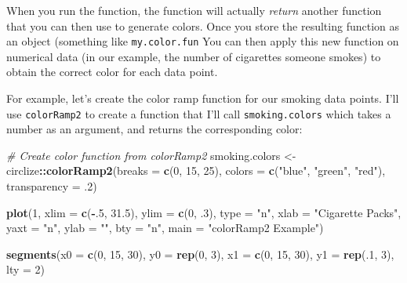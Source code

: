 \documentclass[]{book}
\newenvironment{Shaded}{\begin{snugshade}}{\end{snugshade}}
\newcommand{\KeywordTok}[1]{\textcolor[rgb]{0.13,0.29,0.53}{\textbf{#1}}}
\newcommand{\DataTypeTok}[1]{\textcolor[rgb]{0.13,0.29,0.53}{#1}}
\newcommand{\DecValTok}[1]{\textcolor[rgb]{0.00,0.00,0.81}{#1}}
\newcommand{\FloatTok}[1]{\textcolor[rgb]{0.00,0.00,0.81}{#1}}
\newcommand{\StringTok}[1]{\textcolor[rgb]{0.31,0.60,0.02}{#1}}
\newcommand{\CommentTok}[1]{\textcolor[rgb]{0.56,0.35,0.01}{\textit{#1}}}
\newcommand{\OperatorTok}[1]{\textcolor[rgb]{0.81,0.36,0.00}{\textbf{#1}}}
\newcommand{\NormalTok}[1]{#1}
\theoremstyle{definition}
\theoremstyle{definition}
\theoremstyle{remark}
\begin{document}
When you run the function, the function will actually \emph{return}
another function that you can then use to generate colors. Once you
store the resulting function as an object (something like
\texttt{my.color.fun} You can then apply this new function on numerical
data (in our example, the number of cigarettes someone smokes) to obtain
the correct color for each data point.

For example, let's create the color ramp function for our smoking data
points. I'll use \texttt{colorRamp2} to create a function that I'll call
\texttt{smoking.colors} which takes a number as an argument, and returns
the corresponding color:

\begin{Shaded}
\begin{Highlighting}[]
\CommentTok{# Create color function from colorRamp2}
\NormalTok{smoking.colors <-}\StringTok{ }\NormalTok{circlize}\OperatorTok{::}\KeywordTok{colorRamp2}\NormalTok{(}\DataTypeTok{breaks =} \KeywordTok{c}\NormalTok{(}\DecValTok{0}\NormalTok{, }\DecValTok{15}\NormalTok{, }\DecValTok{25}\NormalTok{),}
                  \DataTypeTok{colors =} \KeywordTok{c}\NormalTok{(}\StringTok{"blue"}\NormalTok{, }\StringTok{"green"}\NormalTok{, }\StringTok{"red"}\NormalTok{),}
                  \DataTypeTok{transparency =}\NormalTok{ .}\DecValTok{2}\NormalTok{)}


\KeywordTok{plot}\NormalTok{(}\DecValTok{1}\NormalTok{, }\DataTypeTok{xlim =} \KeywordTok{c}\NormalTok{(}\OperatorTok{-}\NormalTok{.}\DecValTok{5}\NormalTok{, }\FloatTok{31.5}\NormalTok{), }\DataTypeTok{ylim =} \KeywordTok{c}\NormalTok{(}\DecValTok{0}\NormalTok{, .}\DecValTok{3}\NormalTok{),}
     \DataTypeTok{type =} \StringTok{"n"}\NormalTok{, }\DataTypeTok{xlab =} \StringTok{"Cigarette Packs"}\NormalTok{,}
     \DataTypeTok{yaxt =} \StringTok{"n"}\NormalTok{, }\DataTypeTok{ylab =} \StringTok{""}\NormalTok{, }\DataTypeTok{bty =} \StringTok{"n"}\NormalTok{,}
     \DataTypeTok{main =} \StringTok{"colorRamp2 Example"}\NormalTok{)}

\KeywordTok{segments}\NormalTok{(}\DataTypeTok{x0 =} \KeywordTok{c}\NormalTok{(}\DecValTok{0}\NormalTok{, }\DecValTok{15}\NormalTok{, }\DecValTok{30}\NormalTok{),}
         \DataTypeTok{y0 =} \KeywordTok{rep}\NormalTok{(}\DecValTok{0}\NormalTok{, }\DecValTok{3}\NormalTok{),}
         \DataTypeTok{x1 =} \KeywordTok{c}\NormalTok{(}\DecValTok{0}\NormalTok{, }\DecValTok{15}\NormalTok{, }\DecValTok{30}\NormalTok{),}
         \DataTypeTok{y1 =} \KeywordTok{rep}\NormalTok{(.}\DecValTok{1}\NormalTok{, }\DecValTok{3}\NormalTok{),}
         \DataTypeTok{lty =} \DecValTok{2}\NormalTok{)}


\end{Highlighting}
\end{Shaded}
\end{document}
